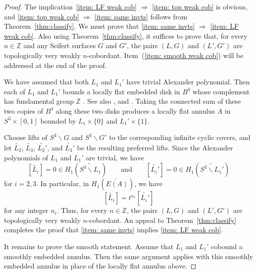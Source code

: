 \documentclass[a4paper, 11pt]{amsart}
\theoremstyle{definition}
\newcommand{\Z}{\mathbb{Z}}
\newcommand{\pref}[1]{(\ref{#1})}
\begin{document}
\begin{proof}
The implication~\eqref{item: LF weak cob} $\Rightarrow$ \eqref{item: top weak cob} is obvious, and \eqref{item: top weak cob} $\Rightarrow$ \eqref{item: same invts} follows from Theorem~\ref{thm:classify}.
We must prove that \eqref{item: same invts} $\Rightarrow$ \eqref{item: LF weak cob}. Also using Theorem~\ref{thm:classify}, it suffices to prove that, for every $n\in \Z$ and any Seifert surfaces $G$ and $G'$, the pairs $(L,G)$ and $(L',G')$ are topologically very weakly $n$-cobordant. %
Item~\pref{item: smooth weak cob} will be addressed at the end of the proof. 

We have assumed that both $L_1$ and $L_1'$ have trivial Alexander polynomial. Then each of $L_1$ and $L_1'$ bounds a locally flat embedded disk in $B^4$ whose complement has fundamental group $\Z$ \cite[Theorem 1.13]{Freedman1}.  See also \cite[Theorem 11.7B]{Freedman-Quinn:1990-1}, and \cite[Appendix A]{Garoufalidis-Teichner:2004-1}. 
Taking the connected sum of these two copies of $B^4$ along these two disks produces a locally flat annulus $A$ in $S^3\times[0,1]$ bounded by $L_1\times\{0\}$ and $L_1'\times\{1\}$.


Choose lifts of $S^3\smallsetminus G$ and $S^3\smallsetminus G'$ to the corresponding infinite cyclic covers, and let
$\widetilde{L_2}$, $\widetilde{L_3}$, $\widetilde{L_2'}$, and $\widetilde{L_3'}$
be the resulting preferred lifts. Since the Alexander polynomials of $L_1$ and $L_1'$ are trivial, we have
\[
[\widetilde{L_i}]=0\in H_1(\widetilde{S^3\smallsetminus L_1})
\qquad\text{and}\qquad
[\widetilde{L_i'}]=0\in H_1(\widetilde{S^3\smallsetminus L_1'})
\]
for $i=2,3$. In particular, in $H_1(\widetilde{E(A)})$, we have
\[
[\widetilde{L_i}]=t^{n_i}[\widetilde{L_i'}]
\]
for any integer $n_i$. Thus, for every $n\in\Z$, the pairs $(L,G)$ and $(L',G')$ are topologically very weakly $n$-cobordant. An appeal to Theorem~\ref{thm:classify} completes the proof that \eqref{item: same invts} implies \eqref{item: LF weak cob}.

It remains to prove the smooth statement. Assume that $L_1$ and $L_1'$ cobound a smoothly embedded annulus. Then the same argument applies with this smoothly embedded annulus in place of the locally flat annulus above.
\end{proof}
\end{document}
